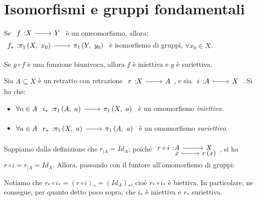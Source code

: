 \section{Isomorfismi e gruppi fondamentali}
\begin{corollary}
	Se $\funz{f}{X}{Y}$ è un omeomorfismo, allora:\\ $\funz{f_{\ast}}{\gruf{X}{x_0}}{\gruf{Y}{y_0}}$ è isomorfismo di gruppi, $\forall x_0\in X$.
\end{corollary}
\begin{remember}
	Se $g\circ f$ è una funzione biunivoca, allora $f$ è iniettiva e $g$ è suriettiva.
\end{remember}
\begin{corollary}
	Sia $A\subseteq X$ è un retratto con retrazione $\funz{r}{X}{A}$, e sia $\incl{i}{A}{X}$. Si ha che:
	\begin{itemize}
		\item $\forall a\in A\ \funz{i_{\ast}}{\gruf{A}{a}}{\gruf{X}{a}}$ è un omomorfismo \textit{iniettivo}.
		\item $\forall a\in A\ \funz{r_{\ast}}{\gruf{X}{a}}{\gruf{A}{a}}$ è un omomorfismo \textit{suriettivo}.
	\end{itemize}
\end{corollary}
\begin{demonstration}
	Sappiamo dalla definizione che $r_{\mid A}=Id_A$; poiché $\funztot{r\circ i}{A}{X}{x}{r\left(x\right)}$, si ha $r\circ i=r_{\mid A}=Id_A$. Allora, passando con il funtore all'omomorfismo di gruppi:
	\begin{center}
	\end{center}
Notiamo che $r_{\ast}\circ i_{\ast}=\left(r\circ i\right)_{\ast}=\left(Id_A\right)_{\ast}$, cioè $r_{\ast}\circ i_{\ast}$ è biettiva. In particolare, ne consegue, per quanto detto poco sopra, che $i_{\ast}$ è iniettiva e $r_{\ast}$ suriettiva.
\end{demonstration}

